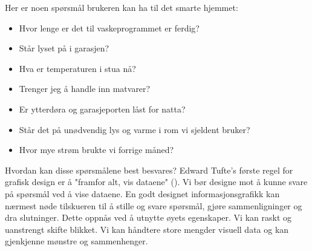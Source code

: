 Her er noen spørsmål brukeren kan ha til det smarte hjemmet:
\begin{itemize}
\item Hvor lenge er det til vaskeprogrammet er ferdig?
\item Står lyset på i garasjen?
\item Hva er temperaturen i stua nå?
\item Trenger jeg å handle inn matvarer?
\item Er ytterdøra og garasjeporten låst for natta?
\item Står det på unødvendig lys og varme i rom vi sjeldent bruker?
\item Hvor mye strøm brukte vi forrige måned?
\end{itemize}
Hvordan kan disse spørsmålene best besvares? Edward Tufte's første regel for grafisk design er å "framfor alt, vis dataene" (\citet{tufte01}). Vi bør designe mot å kunne svare på spørsmål ved å vise dataene. En godt designet informasjonsgrafikk kan nærmest nøde tilskueren til å stille og svare spørsmål, gjøre sammenligninger og dra slutninger. Dette oppnås ved å utnytte øyets egenskaper. Vi kan raskt og uanstrengt skifte blikket. Vi kan håndtere store mengder visuell data og kan gjenkjenne mønstre og sammenhenger.

